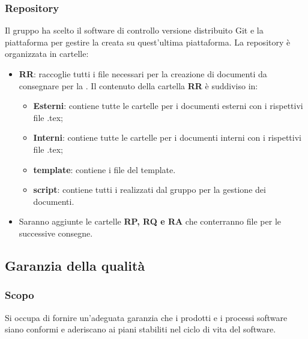         \subsubsection{Repository}
        Il gruppo ha scelto il software di controllo versione distribuito Git e la piattaforma  per gestire la  creata su quest'ultima piattaforma.
            La repository è organizzata in cartelle:
            \begin{itemize}
                \item \textbf{RR}: raccoglie tutti i file necessari per la creazione di documenti da consegnare per la \RR. Il contenuto della cartella \textbf{RR} è suddiviso in:
                    \begin{itemize}
                        \item \textbf{Esterni}: contiene tutte le cartelle per i documenti esterni con i rispettivi file .tex;
                        \item \textbf{Interni}: contiene tutte le cartelle per i documenti interni con i rispettivi file .tex;
                        \item \textbf{template}: contiene i file del template. 
                    \end{itemize}
                
                \begin{itemize}
                    \item \textbf{script}: contiene tutti i  realizzati dal gruppo per la gestione dei documenti.
                \end{itemize}
                \item Saranno aggiunte le cartelle \textbf{RP, RQ e RA} che conterranno file per le successive consegne.
            \end{itemize}
    
    \subsection{Garanzia della qualità}
        \subsubsection{Scopo}
        Si occupa di fornire un'adeguata garanzia che i prodotti e i processi software siano conformi e aderiscano ai piani stabiliti nel ciclo di vita del software.
